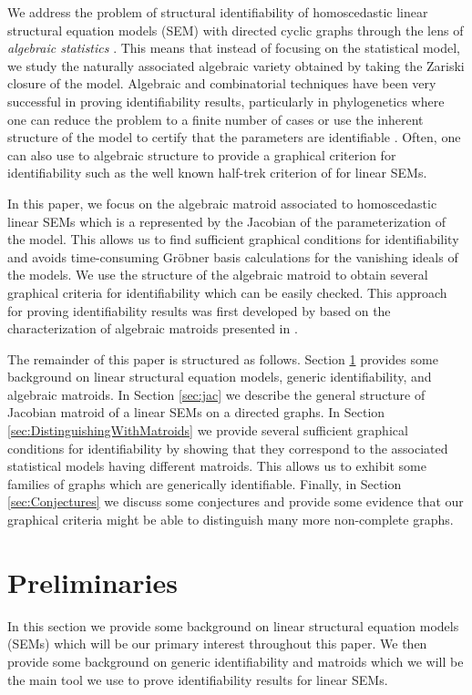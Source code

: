\documentclass[12pt,reqno]{amsart}
\theoremstyle{plain}
\theoremstyle{definition}
\begin{document}
We address the problem of structural identifiability of homoscedastic linear structural equation models (SEM) with directed cyclic graphs 
through the lens of \emph{algebraic statistics} \cite{ASseth}. This means that instead of focusing on the statistical model, we study the naturally associated algebraic variety obtained by taking the Zariski closure of the model. Algebraic and combinatorial techniques have been very successful in proving identifiability results, particularly in phylogenetics where one can reduce the problem to a finite number of cases \cite{gross2018distinguishing, sullivant2012disentangling} or use the inherent structure of the model to certify that the parameters are identifiable \cite{allman2010identifiability}. Often, one can also use to algebraic structure to provide a graphical criterion for identifiability such as the well known half-trek criterion of \cite{foygel2012halftrek} for linear SEMs.  

In this paper, we focus on the algebraic matroid associated to homoscedastic linear SEMs which is a represented by the Jacobian of the parameterization of the model. This allows us to find sufficient graphical conditions for identifiability and avoids time-consuming Gr\"obner basis calculations for the vanishing ideals of the models. We use the structure of the algebraic matroid to obtain several graphical criteria for identifiability which can be easily checked. This approach for proving identifiability results was first developed by \cite{Seth19M} based on the characterization of algebraic matroids presented in \cite{rosen2014computing}. 


The remainder of this paper is structured as follows. Section \ref{sec:pre} provides some background on linear structural equation models, generic identifiability, and algebraic matroids. In Section \ref{sec:jac} we describe the general structure of Jacobian matroid of a linear SEMs on a directed graphs. In Section \ref{sec:DistinguishingWithMatroids} we provide several sufficient graphical conditions for identifiability by showing that they correspond to the associated statistical models having different matroids. This allows us to exhibit some families of graphs which are generically identifiable. Finally, in Section \ref{sec:Conjectures} we discuss some conjectures and provide some evidence that our graphical criteria might be able to distinguish many more non-complete graphs. 


\section{Preliminaries}
\label{sec:pre}
In this section we provide some background on linear structural equation models (SEMs) which will be our primary interest throughout this paper. We then provide some background on generic identifiability and matroids which we will be the main tool we use to prove identifiability results for linear SEMs. 
\end{document}
